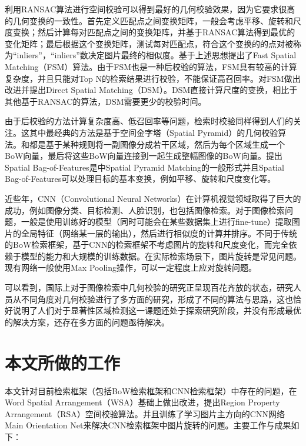 利用RANSAC算法进行空间校验可以得到最好的几何校验效果，因为它要求很高的几何变换的一致性。首先定义匹配点之间变换矩阵，一般会考虑平移、旋转和尺度变换；然后计算每对匹配点之间的变换矩阵，并基于RANSAC算法得到最优的变化矩阵；最后根据这个变换矩阵，测试每对匹配点，符合这个变换的的点对被称为“inliers”，“inliers”数决定图片最终的相似度。\cite{philbin2007object}基于上述思想提出了Fast Spatial Matching（FSM）算法。由于FSM也是一种后校验的算法，FSM具有较高的计算复杂度，并且只能对Top N的检索结果进行校验，不能保证高召回率。\cite{Zhong2015Fast}对FSM做出改进并提出Direct Spatial Matching（DSM）。DSM直接计算尺度的变换，相比于其他基于RANSAC的算法，DSM需要更少的校验时间。

由于后校验的方法计算复杂度高、低召回率等问题，检索时校验同样得到人们的关注。这其中最经典的方法是基于空间金字塔（Spatial Pyramid）的几何校验算法。\cite{lazebnik2006beyond}和\cite{Cao2010Spatial}都是基于某种规则将一副图像分成若干区域，然后为每个区域生成一个BoW向量，最后将这些BoW向量连接到一起生成整幅图像的BoW向量。\cite{Cao2010Spatial}提出Spatial Bag-of-Features是\cite{lazebnik2006beyond}中Spatial Pyramid Matching的一般形式并且Spatial Bag-of-Features可以处理目标的基本变换，例如平移、旋转和尺度变化等。

近些年，CNN（Convolutional Neural Networks）在计算机视觉领域取得了巨大的成功，例如图像分类\cite{krizhevsky2012imagenet}、目标检测\cite{Girshick2014Rich}\cite{girshick2015fast}\cite{ren2015faster}、人脸识别，也包括图像检索\cite{babenko2014neural}。对于图像检索问题，一般是使用训练好的模型（同时可能会在某些数据集上进行fine-tune）提取图片的全局特征（网络某一层的输出），然后进行相似度的计算并排序。不同于传统的BoW检索框架，基于CNN的检索框架不考虑图片的旋转和尺度变化，而完全依赖于模型的能力和大规模的训练数据。在实际检索场景下，图片旋转是常见问题。现有网络一般使用Max Pooling操作，可以一定程度上应对旋转问题。

可以看到，国际上对于图像检索中几何校验的研究正呈现百花齐放的状态，研究人员从不同角度对几何校验进行了多方面的研究，形成了不同的算法与思路，这也恰好说明了人们对于显著性区域检测这一课题还处于探索研究阶段，并没有形成最优的解决方案，还存在多方面的问题亟待解决。



\section{本文所做的工作}
本文针对目前检索框架（包括BoW检索框架和CNN检索框架）中存在的问题，在Word Spatial Arrangement（WSA）\cite{penatti2014visual}基础上做出改进，提出Region Property Arrangement（RSA）空间校验算法。并且训练了学习图片主方向的CNN网络Main Orientation Net来解决CNN检索框架中图片旋转的问题。主要工作与成果如下：

